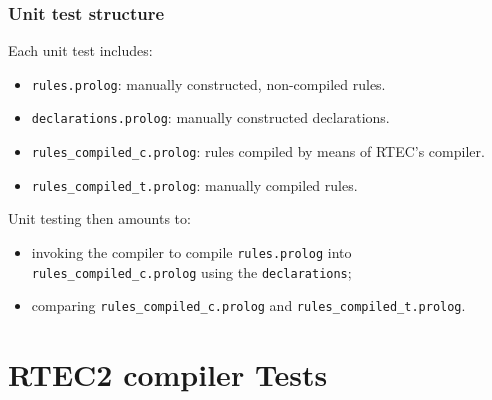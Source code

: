 \documentclass[8pt]{beamer}
\begin{document}

\begin{frame}
  \frametitle{Unit test structure}

Each unit test includes:

\begin{itemize}
\item \texttt{rules.prolog}: manually constructed, non-compiled rules.
\item \texttt{declarations.prolog}: manually constructed declarations.
\item \texttt{rules\_compiled\_c.prolog}: rules compiled by means of RTEC's compiler.
\item \texttt{rules\_compiled\_t.prolog}: manually compiled rules.
\end{itemize}

\bigskip 

Unit testing then amounts to:
\begin{itemize}
\item invoking the compiler to compile \texttt{rules.prolog} into \texttt{rules\_compiled\_c.prolog} using the \texttt{declarations};
\item comparing \texttt{rules\_compiled\_c.prolog} and \texttt{rules\_compiled\_t.prolog}.
\end{itemize}

\end{frame}

\section{RTEC2 compiler Tests}
\end{document}
